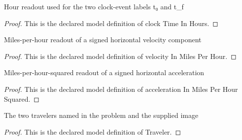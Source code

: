 \begin{definition}
  \label{def:physics:phyx-mini-0830:phyxminiproblems-problemphyxmini0830-clocktimeinhours}
  Hour readout used for the two clock-event labels t₀ and t\_f
\end{definition}
\begin{proof}
  This is the declared model definition of clock Time In Hours.
\end{proof}
\begin{definition}
  \label{def:physics:phyx-mini-0830:phyxminiproblems-problemphyxmini0830-velocityinmilesperhour}
  Miles-per-hour readout of a signed horizontal velocity component
\end{definition}
\begin{proof}
  This is the declared model definition of velocity In Miles Per Hour.
\end{proof}
\begin{definition}
  \label{def:physics:phyx-mini-0830:phyxminiproblems-problemphyxmini0830-accelerationinmilesperhoursquared}
  Miles-per-hour-squared readout of a signed horizontal acceleration
\end{definition}
\begin{proof}
  This is the declared model definition of acceleration In Miles Per Hour Squared.
\end{proof}
\begin{definition}[Traveler]
  \label{def:physics:phyx-mini-0830:phyxminiproblems-problemphyxmini0830-traveler}
  The two travelers named in the problem and the supplied image
\end{definition}
\begin{proof}
  This is the declared model definition of Traveler.
\end{proof}
